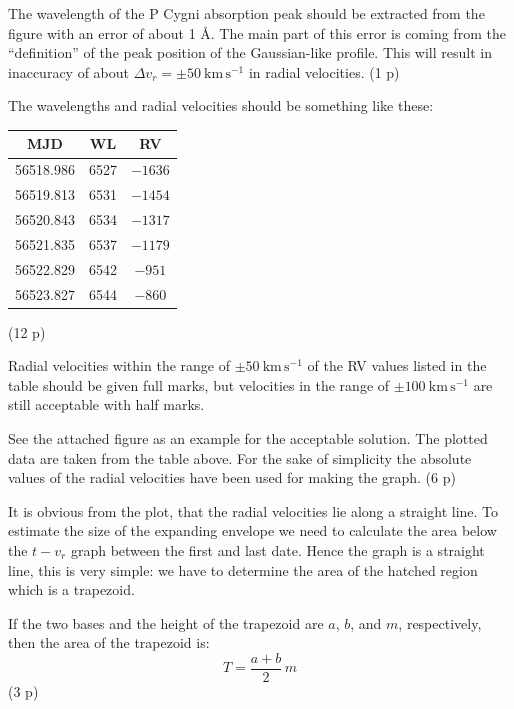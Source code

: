 \begin{description}
  The wavelength of the P Cygni absorption peak should be extracted from the
  figure with an error of about 1 \AA. The main part of this error is coming
  from the ``definition'' of the peak position of the Gaussian-like profile.
  This will result in inaccuracy of about
  $\Delta v_r = \pm 50\ \mathrm{km\,s^{-1}}$ in radial velocities. \hfill(1 p)

  The wavelengths and radial velocities should be something like these:
  \begin{center}
  \begin{tabular}{ccc}
    \hline
    MJD & WL & RV \\
    \hline
    56518.986 & 6527 & $-1636$ \\
    56519.813 & 6531 & $-1454$ \\
    56520.843 & 6534 & $-1317$ \\
    56521.835 & 6537 & $-1179$ \\
    56522.829 & 6542 & $-951$ \\
    56523.827 & 6544 & $-860$ \\
    \hline
  \end{tabular}
  \end{center}
  \hfill(12 p)

  Radial velocities within the range of $\pm 50\ \mathrm{km\,s^{-1}}$ of the
  RV values listed in the table should be given full marks, but velocities in
  the range of $\pm 100\ \mathrm{km\,s^{-1}}$ are still acceptable with half
  marks.

\item[g)] See the attached figure as an example for the acceptable solution.
  The plotted data are taken from the table above. For the sake of simplicity
  the absolute values of the radial velocities have been used for making the
  graph. \hfill(6 p)

\item[h)] It is obvious from the plot, that the radial velocities lie along a
  straight line. To estimate the size of the expanding envelope we need to
  calculate the area below the $t - v_r$ graph between the first and last
  date. Hence the graph is a straight line, this is very simple: we have to
  determine the area of the hatched region which is a trapezoid.

  If the two bases and the height of the trapezoid are $a$, $b$, and $m$,
  respectively, then the area of the trapezoid is:
  \[ T = \frac{a + b}{2}\,m
     \tag*{(1.14)} \]
  \hfill(3 p)


\end{description}
